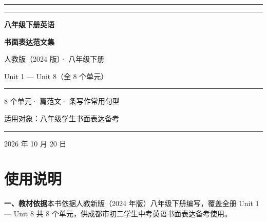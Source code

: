 \documentclass[UTF8,a4paper,11pt,oneside]{ctexbook}
\begin{document}
\linespread{1.32}\selectfont

\begin{titlepage}
  \thispagestyle{empty}
  \centering
  \vspace*{1.4cm}
  {\color{mainblue}\rule{\linewidth}{1.8pt}}\par
  \vspace{0.55cm}
  {\color{rulelight}\rule{\linewidth}{0.6pt}}\par
  \vspace{1.5cm}
  {\sffamily\bfseries\fontsize{36pt}{46pt}\selectfont\color{mainblue} 八年级下册英语\par}
  \vspace{0.35cm}
  {\sffamily\bfseries\fontsize{36pt}{46pt}\selectfont\color{mainblue} 书面表达范文集\par}
  \vspace{1.3cm}
  {\sffamily\fontsize{15pt}{21pt}\selectfont\color{accent} 人教版（2024 版）· 八年级下册\par}
  \vspace{0.3cm}
  {\sffamily\Large\color{mainblue} Unit 1 — Unit 8（全 8 个单元）\par}
  \vspace{1.0cm}
  {\color{accent}\rule{0.62\linewidth}{0.8pt}}\par
  \vspace{0.9cm}
  {\sffamily\large\color{textgray} 8 个单元\quad· 篇范文\quad· 条写作常用句型\par}
  \vfill
  {\large\sffamily 适用对象：八年级学生\quad 书面表达备考\par}
  \vspace{0.9cm}
  {\color{rulelight}\rule{0.62\linewidth}{0.6pt}}\par
  \vspace{0.5cm}
  {\sffamily\normalsize\color{textgray} 2026 年 10 月 20 日\par}
  \vspace*{0.6cm}
\end{titlepage}

\frontmatter
\pagestyle{plain}

\chapter*{使用说明}
{}

\noindent\textbf{一、教材依据}\quad 本书依据人教新版（2024 年版）八年级下册编写，覆盖全册
Unit 1 — Unit 8 共 8 个单元，供成都市初二学生中考英语书面表达备考使用。
\end{document}
